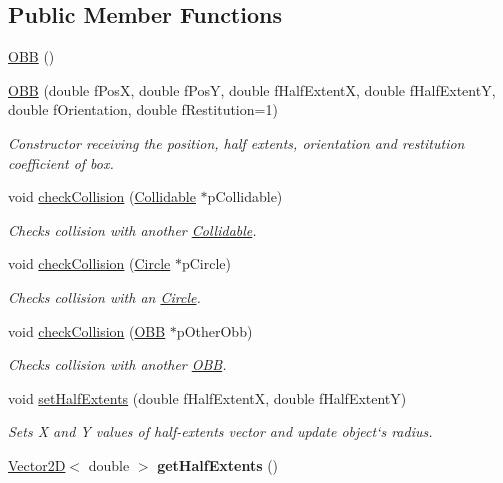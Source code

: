 \subsection*{Public Member Functions}
\begin{DoxyCompactItemize}
\item 
\hyperlink{class_o_b_b_af752af068c6fc1787f06556b6a71c929}{O\+B\+B} ()
\item 
\hyperlink{class_o_b_b_a9a500a3520c516eadca64a3f6f432be5}{O\+B\+B} (double f\+Pos\+X, double f\+Pos\+Y, double f\+Half\+Extent\+X, double f\+Half\+Extent\+Y, double f\+Orientation, double f\+Restitution=1)
\begin{DoxyCompactList}\small\item\em Constructor receiving the position, half extents, orientation and restitution coefficient of box. \end{DoxyCompactList}\item 
void \hyperlink{class_o_b_b_a6e26b518d5780cc3295f98e0f6b1008c}{check\+Collision} (\hyperlink{class_collidable}{Collidable} $\ast$p\+Collidable)
\begin{DoxyCompactList}\small\item\em Checks collision with another \hyperlink{class_collidable}{Collidable}. \end{DoxyCompactList}\item 
void \hyperlink{class_o_b_b_a83b103d909f21edb578bb3cd324362a9}{check\+Collision} (\hyperlink{class_circle}{Circle} $\ast$p\+Circle)
\begin{DoxyCompactList}\small\item\em Checks collision with an \hyperlink{class_circle}{Circle}. \end{DoxyCompactList}\item 
void \hyperlink{class_o_b_b_a8fa42a8b95bf471ef890d758e9ca5b36}{check\+Collision} (\hyperlink{class_o_b_b}{O\+B\+B} $\ast$p\+Other\+Obb)
\begin{DoxyCompactList}\small\item\em Checks collision with another \hyperlink{class_o_b_b}{O\+B\+B}. \end{DoxyCompactList}\item 
void \hyperlink{class_o_b_b_a0367f78bef8252fc122cf1b0c22e332c}{set\+Half\+Extents} (double f\+Half\+Extent\+X, double f\+Half\+Extent\+Y)
\begin{DoxyCompactList}\small\item\em Sets X and Y values of half-\/extents vector and update object`s radius. \end{DoxyCompactList}\item 
\hypertarget{class_o_b_b_acb95cc5ca2f703da43444f6a029d117b}{}\hyperlink{class_vector2_d}{Vector2\+D}$<$ double $>$ {\bfseries get\+Half\+Extents} ()\label{class_o_b_b_acb95cc5ca2f703da43444f6a029d117b}


\end{DoxyCompactItemize}
